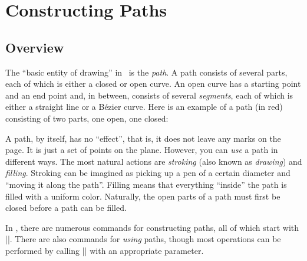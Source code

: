 %
%
%


\section{Constructing Paths}

\subsection{Overview}

The ``basic entity of drawing'' in \pgfname\ is the \emph{path}. A path
consists of several parts, each of which is either a closed or open curve. An
open curve has a starting point and an end point and, in between, consists of
several \emph{segments}, each of which is either a straight line or a Bézier
curve. Here is an example of a path (in red) consisting of two parts, one open,
one closed:
%
\begin{codeexample}[]
\end{codeexample}

A path, by itself, has no ``effect'', that is, it does not leave any marks on
the page. It is just a set of points on the plane. However, you can \emph{use}
a path in different ways. The most natural actions are \emph{stroking} (also
known as \emph{drawing}) and \emph{filling}. Stroking can be imagined as
picking up a pen of a certain diameter and ``moving it along the path''.
Filling means that everything ``inside'' the path is filled with a uniform
color. Naturally, the open parts of a path must first be closed before a path
can be filled.

In \pgfname, there are numerous commands for constructing paths, all of which
start with |\pgfpath|. There are also commands for \emph{using} paths, though
most operations can be performed by calling |\pgfusepath| with an appropriate
parameter.

